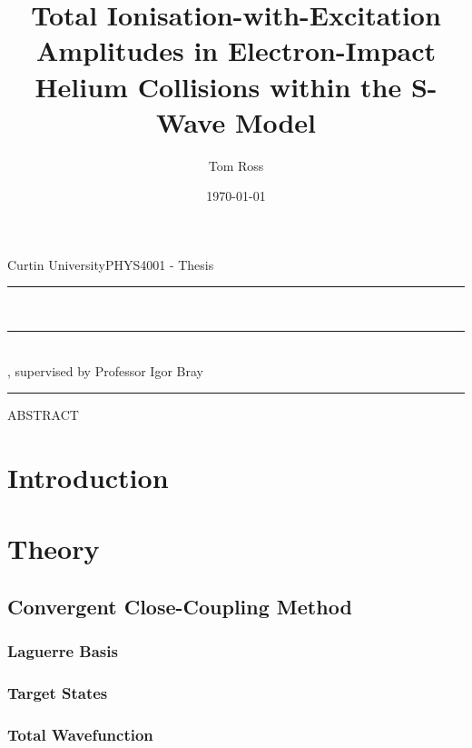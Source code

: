 \documentclass[draft]{article}
\title{Total Ionisation-with-Excitation Amplitudes in Electron-Impact Helium
  Collisions within the S-Wave Model}
\author{Tom Ross}
\date{\today}
\gdef\theassessment{PHYS4001 - Thesis}
\gdef\thesupervisor{Professor Igor Bray}
\gdef\theinstitution{Curtin University}
\begin{document}

\begin{titlepage}
  \begin{flushleft}
    \theinstitution \hfill \theassessment
  \end{flushleft}
  \hrule
  \begin{center}
    {\huge\thetitle}
    \\
    \rule[1.0pt]{8.5cm}{0.4pt}
    \\
    {\large \theauthor, supervised by \thesupervisor}
  \end{center}
  \hrule
  \begin{center}
    ABSTRACT
  \end{center}
\end{titlepage}

\clearpage


\tableofcontents

\listoffigures



\clearpage

\section{Introduction}
\label{sec:introduction}

\section{Theory}
\label{sec:theory}

\subsection{Convergent Close-Coupling Method}
\label{sec:ccc-method}

\subsubsection{Laguerre Basis}
\label{sec:laguerre-basis}

\subsubsection{Target States}
\label{sec:target-states}

\subsubsection{Total Wavefunction}
\label{sec:total-wavefunction}
\end{document}
